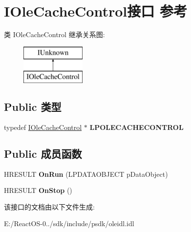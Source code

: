 \hypertarget{interface_i_ole_cache_control}{}\section{I\+Ole\+Cache\+Control接口 参考}
\label{interface_i_ole_cache_control}
类 I\+Ole\+Cache\+Control 继承关系图\+:\begin{figure}[H]
\begin{center}
\leavevmode
\includegraphics[height=2.000000cm]{interface_i_ole_cache_control}
\end{center}
\end{figure}
\subsection*{Public 类型}
\begin{DoxyCompactItemize}
\item 
\mbox{\label{interface_i_ole_cache_control_ae3a94045457267c0b7e491b24d50fac1}} 
typedef \hyperlink{interface_i_ole_cache_control}{I\+Ole\+Cache\+Control} $\ast$ {\bfseries L\+P\+O\+L\+E\+C\+A\+C\+H\+E\+C\+O\+N\+T\+R\+OL}
\end{DoxyCompactItemize}
\subsection*{Public 成员函数}
\begin{DoxyCompactItemize}
\item 
\mbox{\label{interface_i_ole_cache_control_a1fbcca5047e376a5795778079ef12117}} 
H\+R\+E\+S\+U\+LT {\bfseries On\+Run} (L\+P\+D\+A\+T\+A\+O\+B\+J\+E\+CT p\+Data\+Object)
\item 
\mbox{\label{interface_i_ole_cache_control_a766452a9ef2a528a69c8a0c8e10e63d8}} 
H\+R\+E\+S\+U\+LT {\bfseries On\+Stop} ()
\end{DoxyCompactItemize}


该接口的文档由以下文件生成\+:\begin{DoxyCompactItemize}
\item 
E\+:/\+React\+O\+S-\/0../sdk/include/psdk/oleidl.\+idl\end{DoxyCompactItemize}
